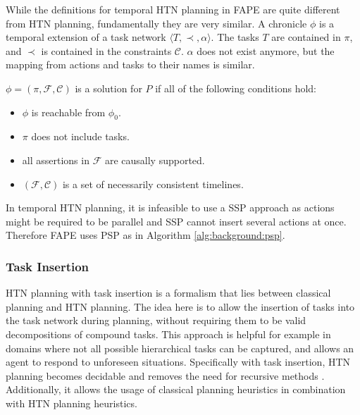 While the definitions for temporal \ac{HTN} planning in \ac{FAPE} are quite different from \ac{HTN} planning, fundamentally they are very similar.
A chronicle $\phi$ is a temporal extension of a task network $\langle T,\prec,\alpha \rangle$.
The tasks $T$ are contained in $\pi$, and $\prec$ is contained in the constraints $\mathcal{C}$.
$\alpha$ does not exist anymore, but the mapping from actions and tasks to their names is similar.


\begin{definition}
  $\phi = (\pi,\mathcal{F},\mathcal{C})$ is a solution for $P$ if all of the following conditions hold:
  \begin{itemize}
    \item $\phi$ is reachable from $\phi_0$.
    \item $\pi$ does not include tasks.
    \item all assertions in $\mathcal{F}$ are causally supported.
    \item $(\mathcal{F},\mathcal{C})$ is a set of necessarily consistent timelines.
  \end{itemize}
\end{definition}

In temporal \ac{HTN} planning, it is infeasible to use a \ac{SSP} approach as actions might be required to be parallel and \ac{SSP} cannot insert several actions at once.
Therefore \ac{FAPE} uses \ac{PSP} as in Algorithm \ref{alg:background:psp}.

\subsubsection{Task Insertion}

\ac{HTN} planning with task insertion \citep{geierDecidabilityHTNPlanning2011} is a formalism that lies between classical planning and \ac{HTN} planning.
The idea here is to allow the insertion of tasks into the task network during planning, without requiring them to be valid decompositions of compound tasks.
This approach is helpful for example in domains where not all possible hierarchical tasks can be captured, and allows an agent to respond to unforeseen situations.
Specifically with task insertion, \ac{HTN} planning becomes decidable \citep{geierDecidabilityHTNPlanning2011} and removes the need for recursive methods \citep{bercherSurveyHierarchicalPlanning2019}. 
Additionally, it allows the usage of classical planning heuristics in combination with \ac{HTN} planning heuristics.

